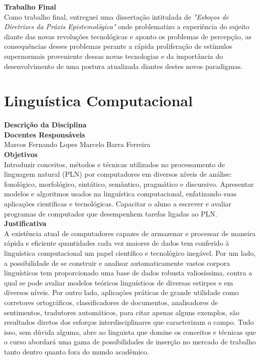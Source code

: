 \textbf{Trabalho Final}\\
Como trabalho final, entreguei uma dissertação intitulada de \textit{"Esboços de Diretrizes da Práxis Epistemológica"} onde problematizo a experiência do sujeito diante das novas revoluções tecnológicas e aponto os problemas de percepção, as consequências desses problemas perante a rápida proliferação de estímulos supernormais proveniente dessas novas tecnologias e da importância do desenvolvimento de uma postura atualizada diantes destes novos paradigmas.

\section{Linguística Computacional}
\textbf{\Large Descrição da Disciplina}\\

\textbf{Docentes Responsáveis}\\
\hspace*{1.6em}Marcos Fernando Lopes
\hspace*{1.6em}Marcelo Barra Ferreira\\

\textbf{Objetivos}\\
\hspace*{1.6em}Introduzir conceitos, métodos e técnicas utilizados no processamento de linguagem natural (PLN) por computadores em diversos níveis de análise: fonológico, morfológico, sintático, semântico, pragmático e discursivo. Apresentar modelos e algoritmos usados na linguística computacional, enfatizando suas aplicações científicas e tecnológicas. Capacitar o aluno a escrever e avaliar programas de computador que desempenhem tarefas ligadas ao PLN.\\

\textbf{Justificativa}\\
\hspace*{1.6em}A existência atual de computadores capazes de armazenar e processar de maneira rápida e eficiente quantidades cada vez maiores de dados tem conferido à linguística computacional um papel científico e tecnológico inegável. Por um lado, a possibilidade de se construir e analisar automaticamente vastos corpora linguísticos tem proporcionado uma base de dados robusta valiosíssima, contra a qual se pode avaliar modelos teóricos linguísticos de diversas estirpes e em diversos níveis. Por outro lado, aplicações práticas de grande utilidade como corretores ortográficos, classificadores de documentos, analisadores de sentimentos, tradutores automáticos, para citar apenas alguns exemplos, são resultados diretos dos esforços interdisciplinares que caracterizam o campo. Tudo isso, sem dúvida alguma, abre ao linguista que domine os conceitos e técnicas que o curso abordará uma gama de possibilidades de inserção no mercado de trabalho tanto dentro quanto fora do mundo acadêmico.\\

